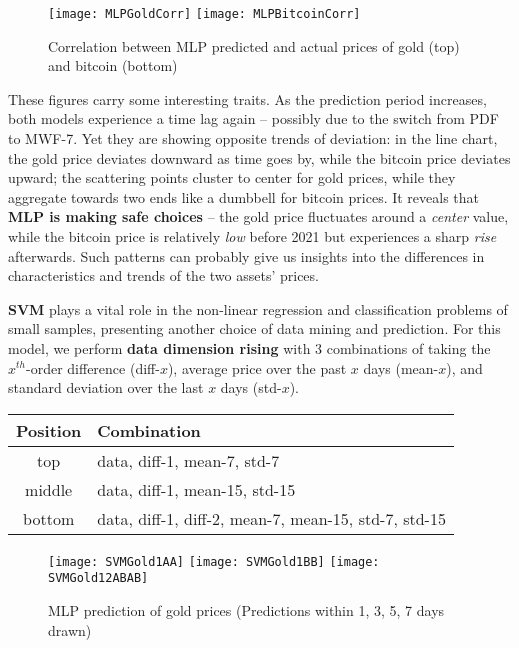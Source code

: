 \documentclass{mcmthesis}
\begin{document}
	\begin{figure}[h]
		\centering \texttt{[image: MLPGoldCorr]}
		\centering \texttt{[image: MLPBitcoinCorr]}
		\caption{Correlation between MLP predicted and actual prices of gold (top) and bitcoin (bottom)}
	\end{figure}
	
	These figures carry some interesting traits. As the prediction period increases, both models experience a time lag again -- possibly due to the switch from PDF to MWF-7. Yet they are showing opposite trends of deviation: in the line chart, the gold price deviates downward as time goes by, while the bitcoin price deviates upward; the scattering points cluster to center for gold prices, while they aggregate towards two ends like a dumbbell for bitcoin prices. It reveals that \textbf{MLP is making safe choices} -- the gold price fluctuates around a \textit{center} value, while the bitcoin price is relatively \textit{low} before 2021 but experiences a sharp \textit{rise} afterwards. Such patterns can probably give us insights into the differences in characteristics and trends of the two assets' prices. 
	
	\textbf{SVM} plays a vital role in the non-linear regression and classification problems of small samples, presenting another choice of data mining and prediction. For this model, we perform \textbf{data dimension rising} with 3 combinations of taking the $x^{th}$-order difference (diff-$x$), average price over the past $x$ days (mean-$x$), and standard deviation over the last $x$ days (std-$x$). 
	
	\begin{center}
		\begin{tabular}{cl}
			\toprule
			Position & Combination \\ \midrule
			top & data, diff-1, mean-7, std-7 \\
			middle & data, diff-1, mean-15, std-15 \\
			bottom & data, diff-1, diff-2, mean-7, mean-15, std-7, std-15 \\
			\bottomrule
		\end{tabular}
	\end{center}
	
	\begin{figure}[h]
		\centering \texttt{[image: SVMGold1AA]}
		\centering \texttt{[image: SVMGold1BB]}
		\centering \texttt{[image: SVMGold12ABAB]}
		\caption{MLP prediction of gold prices (Predictions within 1, 3, 5, 7 days drawn)}
	\end{figure}
	
\end{document}
